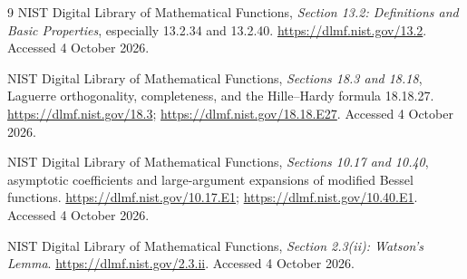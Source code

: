 \documentclass[11pt,a4paper]{article}
\numberwithin{equation}{section}
\theoremstyle{definition}
\theoremstyle{remark}
\theoremstyle{definition}
\begin{document}
\begin{thebibliography}{9}
NIST Digital Library of Mathematical Functions,
\emph{Section 13.2: Definitions and Basic Properties},
especially 13.2.34 and 13.2.40.
\url{https://dlmf.nist.gov/13.2}.
Accessed 4 October 2026.

NIST Digital Library of Mathematical Functions,
\emph{Sections 18.3 and 18.18}, Laguerre orthogonality, completeness,
and the Hille--Hardy formula 18.18.27.
\url{https://dlmf.nist.gov/18.3};
\url{https://dlmf.nist.gov/18.18.E27}.
Accessed 4 October 2026.

NIST Digital Library of Mathematical Functions,
\emph{Sections 10.17 and 10.40}, asymptotic coefficients and
large-argument expansions of modified Bessel functions.
\url{https://dlmf.nist.gov/10.17.E1};
\url{https://dlmf.nist.gov/10.40.E1}.
Accessed 4 October 2026.

NIST Digital Library of Mathematical Functions,
\emph{Section 2.3(ii): Watson's Lemma}.
\url{https://dlmf.nist.gov/2.3.ii}.
Accessed 4 October 2026.

\end{thebibliography}
\end{document}
